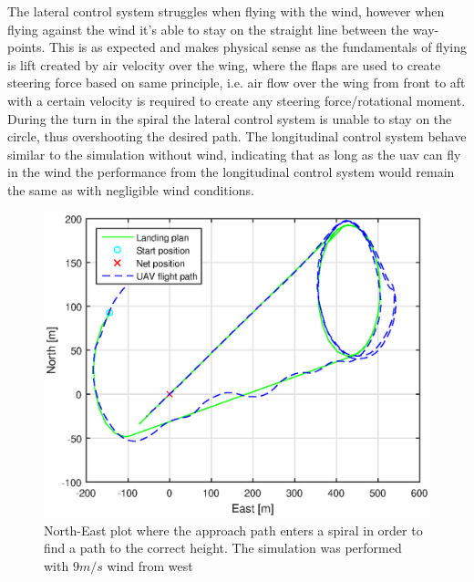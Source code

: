 The lateral control system struggles when flying with the wind, however when flying against the wind it's able to stay on the straight line between the way-points. This is as expected and makes physical sense as the fundamentals of flying is lift created by air velocity over the wing, where the flaps are used to create steering force based on same principle, i.e. air flow over the wing from front to aft with a certain velocity is required to create any steering force/rotational moment. During the turn in the spiral the lateral control system is unable to stay on the circle, thus overshooting the desired path. The longitudinal control system behave similar to the simulation without wind, indicating that as long as the \gls{uav} can fly in the wind the performance from the longitudinal control system would remain the same as with negligible wind conditions.
\newpage
\begin{figure}[H]
\centering
\includegraphics[scale=0.7]{figs/SysPlot/SILNorthEast6juni092307.eps}
\caption{North-East plot where the approach path enters a spiral in order to find a path to the correct height. The simulation was performed with $9 m/s$ wind from west}
\label{Fig:SILNorthEastSpiral092307}
\end{figure}
